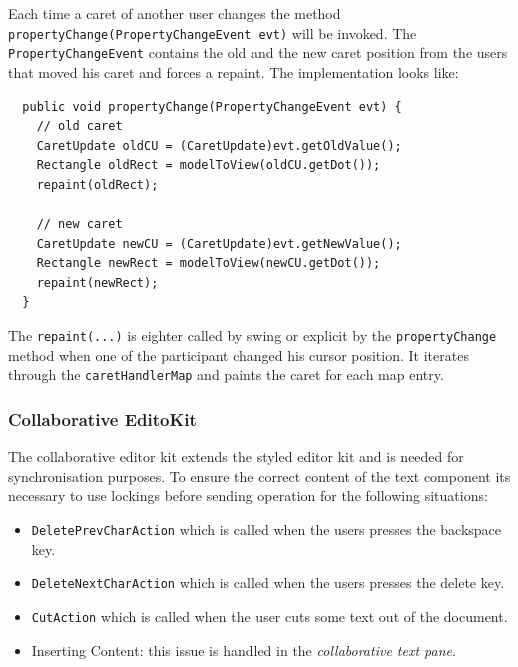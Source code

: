 Each time a caret of another user changes the method \texttt{propertyChange(PropertyChangeEvent evt)} will be invoked. The \texttt{PropertyChangeEvent} contains the old and the new caret position from the users that moved his caret and forces a repaint. The implementation looks like:
\begin{verbatim}
  public void propertyChange(PropertyChangeEvent evt) {
    // old caret
    CaretUpdate oldCU = (CaretUpdate)evt.getOldValue();
    Rectangle oldRect = modelToView(oldCU.getDot());
    repaint(oldRect);

    // new caret
    CaretUpdate newCU = (CaretUpdate)evt.getNewValue();
    Rectangle newRect = modelToView(newCU.getDot());
    repaint(newRect);
  }
\end{verbatim}
The \texttt{repaint(...)} is eighter called by swing or explicit by the \texttt{propertyChange} method when one of the participant changed his cursor position. It iterates through the \texttt{caretHandlerMap} and paints the caret for each map entry.

\subsubsection{Collaborative EditoKit}
\label{collaborative_editor_kit}
The collaborative editor kit extends the styled editor kit and is needed for synchronisation purposes. To ensure the correct content of the text component its necessary to use lockings before sending operation for the following situations:
\begin{itemize}
\item \texttt{DeletePrevCharAction} which is called when the users presses the backspace key.
\item \texttt{DeleteNextCharAction} which is called when the users presses the delete key.
\item \texttt{CutAction} which is called when the user cuts some text out of the document.
\item Inserting Content: this issue is handled in the \textit{collaborative text pane}.
\end{itemize}

